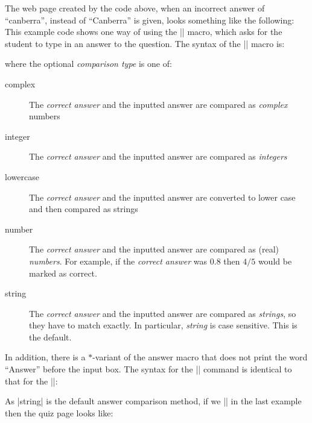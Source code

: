 \documentclass[svgnames]{article}
\begin{document}
    The web page created by the code above, when an incorrect answer of
    ``canberra'', instead of ``Canberra'' is given, looks something like
    the following:
    This example code shows one way of using the \LatexCode|\answer| macro, which
    asks for the student to type in an answer to the question. The syntax of the
    \LatexCode|\answer| macro is:
    \begin{latexcode}
    \end{latexcode}
    where the optional \textit{comparison type} is one of:
    \begin{description}
        \item[complex] 
        The \textit{correct answer} and the inputted answer
        are compared as \textit{complex} numbers
        \item[integer] 
        The \textit{correct answer} and the inputted answer
        are compared as \textit{integers}
        \item[lowercase] 
        The \textit{correct answer} and the inputted answer
        are converted to lower case and then compared as strings
        \item[number] 
        The \textit{correct answer} and the inputted answer
        are compared as (real) \textit{numbers}. For example, if the
        \textit{correct answer} was $0.8$ then $4/5$ would be marked as
        correct.
        \item[string] 
        The \textit{correct answer} and the inputted answer are compared
        as \textit{strings}, so they have to match exactly. In particular,
        \textit{string} is case sensitive. This is the default.
    \end{description}
    In addition, there is a $*$-variant of the answer macro that does
    not print the word ``Answer'' before the input box. The syntax for
    the \LatexCode|\answer*| command is identical to that for the
    \LatexCode|\answer|:
    \begin{latexcode}
    \end{latexcode}
    As \LatexCode|string| is the default answer comparison method, if we
    \LatexCode|| in the last example then the quiz
    page looks like:
\end{document}
